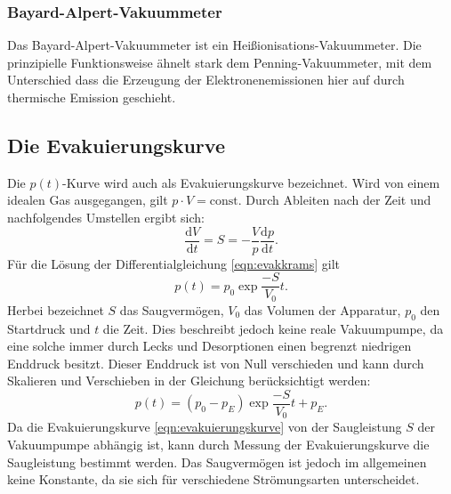 \subsubsection*{Bayard-Alpert-Vakuummeter}
Das Bayard-Alpert-Vakuummeter ist ein Heißionisations-Vakuummeter. Die prinzipielle Funktionsweise ähnelt
stark dem Penning-Vakuummeter, mit dem Unterschied dass die Erzeugung der Elektronenemissionen hier auf durch
thermische Emission geschieht.

\subsection{Die Evakuierungskurve}
\label{subsec:evakutheorie}
Die $p(t)$-Kurve wird auch als Evakuierungskurve bezeichnet. Wird von einem idealen Gas ausgegangen,
gilt $p \cdot V = \text{const}$. Durch Ableiten nach der Zeit und nachfolgendes Umstellen ergibt sich:
\begin{equation}
 \frac{\text{d}V}{\text{d}t} = S = - \frac{V}{p} \frac{\text{d}p}{\text{d}t}.
 \label{eqn:evakkrams}
\end{equation}
Für die Lösung der Differentialgleichung \ref{eqn:evakkrams} gilt
\begin{equation}
 p(t) = p_{0} \exp{\frac{-S}{V_{0}}t}.
\end{equation}
Herbei bezeichnet $S$ das Saugvermögen, $V_{0}$ das Volumen der Apparatur, $p_{0}$ den Startdruck und
$t$ die Zeit. Dies beschreibt jedoch keine reale Vakuumpumpe, da eine solche immer durch Lecks und Desorptionen
einen begrenzt niedrigen Enddruck besitzt. Dieser Enddruck ist von Null verschieden und kann durch Skalieren
und Verschieben in der Gleichung berücksichtigt werden:
\begin{equation}
 p(t) = (p_{0} - p_{E}) \exp{\frac{-S}{V_{0}}t} + p_{E}.
 \label{eqn:evakuierungskurve}
\end{equation}
Da die Evakuierungskurve \ref{eqn:evakuierungskurve} von der Saugleistung $S$ der Vakuumpumpe abhängig ist,
kann durch Messung der Evakuierungskurve die Saugleistung bestimmt werden. Das Saugvermögen ist jedoch
im allgemeinen keine Konstante, da sie sich für verschiedene Strömungsarten unterscheidet.


